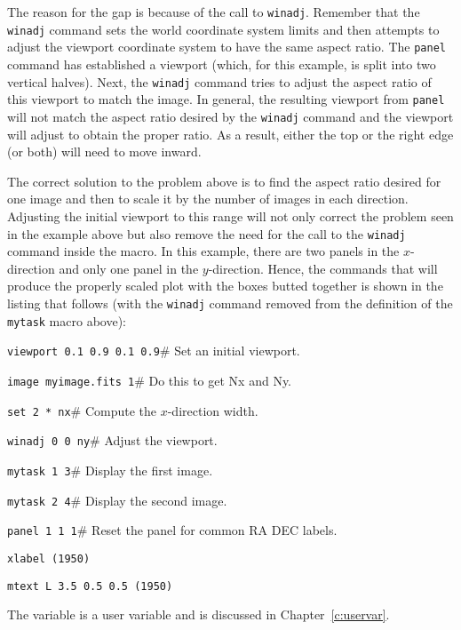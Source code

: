 The reason for the gap is because of the call to {\tt winadj}.
Remember that the {\tt winadj} command sets the
world
coordinate system limits and then attempts to adjust
the viewport
coordinate system to have the same aspect ratio.
The {\tt panel} command has established a viewport (which, for this
example, is split into two vertical halves).
Next, the {\tt winadj} command tries to
adjust the aspect ratio of this viewport to match the image.
In general, the resulting viewport from {\tt panel} will not match the
aspect ratio desired by the {\tt winadj} command and the viewport will
adjust to obtain the proper ratio.
As a result, either the top or the right edge (or both) will
need to move inward.

The correct solution to the problem above is to find the aspect
ratio desired for one image and then to scale it by the number of images
in each direction.
Adjusting the initial viewport to this range will not only correct the
problem seen in the example above but also remove the need for the call
to the {\tt winadj} command inside the macro.
In this example, there are two panels in the $x$-direction and only one
panel in the $y$-direction.
Hence, the commands
that will produce the properly scaled plot with the boxes butted together
is shown in the listing that follows
(with the {\tt winadj} command removed from the definition of
the {\tt mytask} macro above):
\begin{wiplist}%
  \item {\tt viewport 0.1 0.9 0.1 0.9}\hfill \# Set an initial viewport.
\samepage
  \item {\tt image myimage.fits 1}\hfill \# Do this to get Nx and Ny.
  \item {\tt set  2 * nx}\hfill \# Compute the $x$-direction width.
  \item {\tt winadj 0  0 ny}\hfill \# Adjust the viewport.
  \item {\tt mytask 1 3}\hfill \# Display the first image.
  \item {\tt mytask 2 4}\hfill \# Display the second image.
  \item {\tt panel 1 1 1}\hfill \# Reset the panel for common RA DEC labels.
  \item {\tt xlabel  (1950)}
  \item {\tt mtext L 3.5 0.5 0.5  (1950)}
\end{wiplist}
The variable  is a user variable and is discussed in
Chapter~\ref{c:uservar}.

